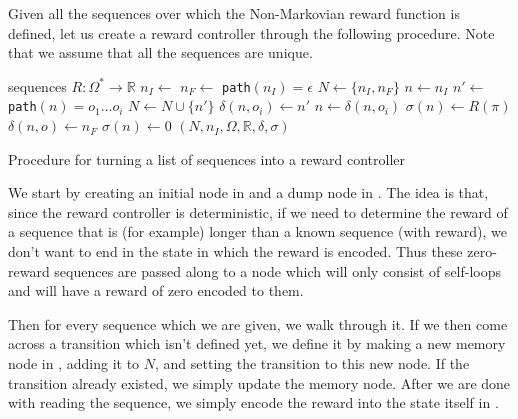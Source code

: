 Given all the sequences over which the Non-Markovian reward function is defined, let us create a reward controller through the following procedure. Note that we assume that all the sequences are unique.
\begin{algorithm}[H]
	\begin{algorithmic}[1]
		\Require sequences
		\Require $R : \Omega^* \to \mathbb{R}$
		\State $n_I \gets $   \label{l:initial_node}
		\State $n_F \gets $    \label{l:dump_node}
		\State \texttt{path}$(n_I)=\epsilon$ \label{l:empty_path}
		\State $N\gets\{n_I,n_F\}$
			\State $n \gets n_I$
					\State $n'\gets$   \label{l:new_transition}
					\State \texttt{path}$(n)=o_1\dots o_i$
					\State $N \gets N \cup \{n'\}$		
					\State $\delta(n,o_i) \gets n'$	\label{l:set_transition}
				\EndIf 
				\State $n \gets \delta(n,o_i)$     
			\EndFor
			\State $\sigma(n) \gets R(\pi)$  \label{l:set_reward}
		\EndFor
		 
				 
					\State $\delta(n,o) \gets n_F$ \label{l:self_loop}
				\EndIf
			\EndFor
				\State $\sigma(n) \gets 0$ \label{l:set_zero}
			\EndIf
		\EndFor
		\State \Return $(N,n_I,\Omega,\mathbb{R},\delta,\sigma)$
		\EndProcedure
	\end{algorithmic}
	\caption{Procedure for turning a list of sequences into a reward controller}
	\label{procedure:into_reward_controller}
\end{algorithm}

We start by creating an initial node in  and a dump node in . The idea is that, since the reward controller is deterministic, if we need to determine the reward of a sequence that is (for example) longer than a known sequence (with reward), we don't want to end in the state in which the reward is encoded. Thus these zero-reward sequences are passed along to a node which will only consist of self-loops and will have a reward of zero encoded to them.

Then for every sequence which we are given, we walk through it. If we then come across a transition which isn't defined yet, we define it by making a new memory node in , adding it to $N$, and setting the transition to this new node. If the transition already existed, we simply update the memory node. After we are done with reading the sequence, we simply encode the reward into the state itself in .

